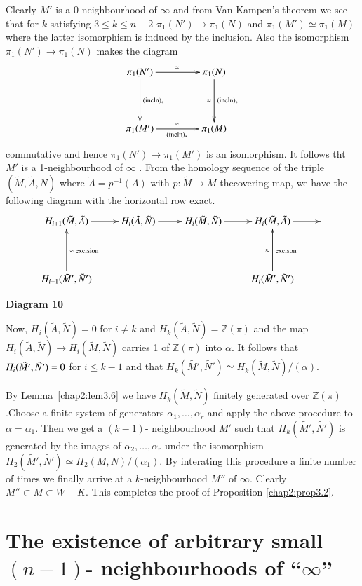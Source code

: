 Clearly $M'$ is a 0-neighbourhood of $\infty$ and from Van Kampen's
theorem we see that for $k$ satisfying $3 \leq k \leq n-2$  $\pi_1 (N')
\to \pi_1 (N)$ and $\pi_1 (M') \simeq \pi_1 (M)$ where the latter
isomorphism is induced by the inclusion. Also the isomorphism $\pi_1
(N') \to \pi_1 (N)$ makes the diagram 
\[
\xymatrix@R=1.5cm@C=1.5cm{
\pi_1 (N') \ar[r]^{\simeq}\ar[d]^{\rm(incln)_*} & \pi_1 (N)
\ar[d]^{\rm(incln)_*}_{\approx}\\
\pi_1 (M') \ar[r]^{\approx}_{\rm (incln)_*} & \pi_1 (M)
}
\]
commutative and hence $\pi_1 (N') \to \pi_1 (M')$ is an
isomorphism. It follows tht $M'$ is a 1-neighbourhood of $\infty$
. From the homology sequence of the triple $(\tilde{M}, \tilde{A},
\tilde{N})$ where $\tilde{A}= p^{-1}(A)$ with $p: \tilde{M}\to M$
the\pageoriginale covering map, we have the following diagram with the
horizontal row exact.  
\[
\xymatrix@R=1.5cm{
H_{i+1} (\tilde{M}, \tilde{A}) \ar[r] & H_i (\tilde{A}, \tilde{N})
\ar[r] & H_i(\tilde{M}, \tilde{N})  \ar[r] & H_i (\tilde{M},
\tilde{A}) \ar[r] & \\
H_{i+1} (\tilde{M}', \tilde{N}') \ar[u]_{\approx \text{ excision}} &
& & H_i (\tilde{M}', \tilde{N}')\ar[u]_{\rm excison}^{\approx} & 
}
\]
\begin{center}
{\bf Diagram 10}
\end{center}

Now, $H_i (\tilde{A}, \tilde{N}) = 0$ for $i \neq k$ and $H_k
(\tilde{A}, \tilde{N})=\mathbb{Z}(\pi)$ and the map $ H_i (\tilde{A},
\tilde{N}) \to H_i (\tilde{M}, \tilde{N})$ carries 1 of $\mathbb{Z}
(\pi)$ into $\alpha$. It follows that $H_i (\tilde{M'},\break \tilde{N'}) =
0$ for $i \leq k-1$ and that $H_k (\tilde{M'}, \tilde{N'})\simeq H_k
(\tilde{M}, \tilde{N})/ (\alpha)$. 

By Lemma~\ref{chap2:lem3.6} we have $H_k(\tilde{M}, \tilde{N})$ finitely generated
over $\mathbb{Z} (\pi)$.\break Choose a finite system of generators
$\alpha_1, \ldots, \alpha_r$ and apply the above procedure to $\alpha
= \alpha_1$. Then we get a $(k-1)$- neighbourhood $M'$ such that $H_k
(\tilde{M'}, \tilde{N'})$ is generated by the images of $\alpha_2,
\ldots, \alpha_r$ under the isomorphism $H_2 (\tilde{M'}, \tilde{N'})
\simeq H_2 (M, N)/ (\alpha_1)$. By interating this procedure a finite
number of times we finally arrive at a $k$-neighbourhood $M''$ of
$\infty$. Clearly $M'' \subset M \subset W-K$. This completes the
proof of Proposition \ref{chap2:prop3.2}. 

\section[The existence of arbitrary small...]{The existence of arbitrary small $(n-1)$- neighbourhoods of
  ``$\infty$''} \label{chap2:sec4}%

